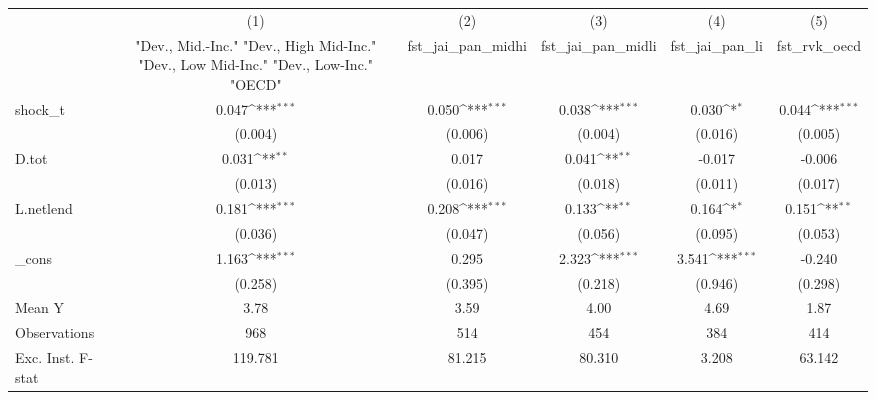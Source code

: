 {
\def\sym#1{\ifmmode^{#1}\else\(^{#1}\)\fi}
\begin{tabular}{l*{5}{c}}
\toprule
            &\multicolumn{1}{c}{(1)}&\multicolumn{1}{c}{(2)}&\multicolumn{1}{c}{(3)}&\multicolumn{1}{c}{(4)}&\multicolumn{1}{c}{(5)}\\
            &\multicolumn{1}{c}{ "Dev., Mid.-Inc." "Dev., High Mid-Inc." "Dev., Low Mid-Inc." "Dev., Low-Inc." "OECD" }&\multicolumn{1}{c}{fst\_jai\_pan\_midhi}&\multicolumn{1}{c}{fst\_jai\_pan\_midli}&\multicolumn{1}{c}{fst\_jai\_pan\_li}&\multicolumn{1}{c}{fst\_rvk\_oecd}\\
\midrule
shock\_t     &       0.047\sym{***}&       0.050\sym{***}&       0.038\sym{***}&       0.030\sym{*}  &       0.044\sym{***}\\
            &     (0.004)         &     (0.006)         &     (0.004)         &     (0.016)         &     (0.005)         \\
\addlinespace
D.tot       &       0.031\sym{**} &       0.017         &       0.041\sym{**} &      -0.017         &      -0.006         \\
            &     (0.013)         &     (0.016)         &     (0.018)         &     (0.011)         &     (0.017)         \\
\addlinespace
L.netlend   &       0.181\sym{***}&       0.208\sym{***}&       0.133\sym{**} &       0.164\sym{*}  &       0.151\sym{**} \\
            &     (0.036)         &     (0.047)         &     (0.056)         &     (0.095)         &     (0.053)         \\
\addlinespace
\_cons      &       1.163\sym{***}&       0.295         &       2.323\sym{***}&       3.541\sym{***}&      -0.240         \\
            &     (0.258)         &     (0.395)         &     (0.218)         &     (0.946)         &     (0.298)         \\
\midrule
Mean Y      &        3.78         &        3.59         &        4.00         &        4.69         &        1.87         \\
Observations&         968         &         514         &         454         &         384         &         414         \\
Exc. Inst. F-stat&     119.781         &      81.215         &      80.310         &       3.208         &      63.142         \\
\bottomrule
\end{tabular}
}
